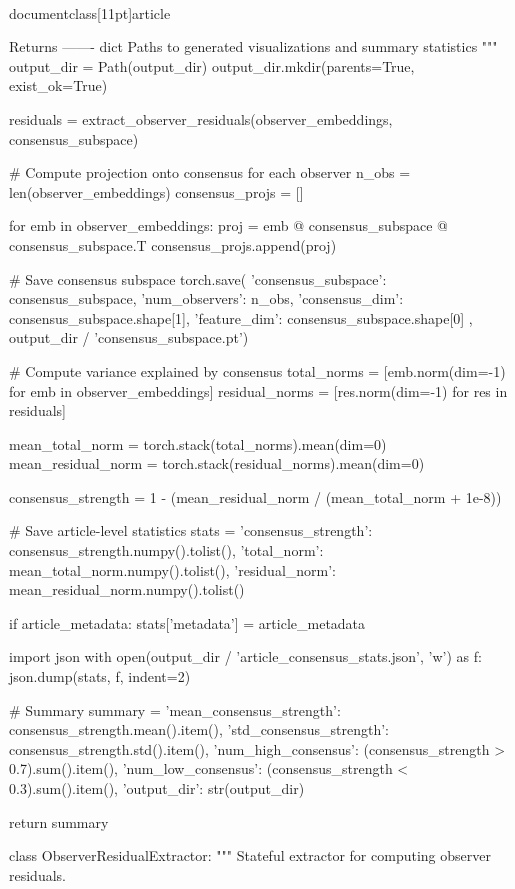\\documentclass[11pt]{article}
\begin{document}
\begin{CodeBlock}
    Returns
    -------
    dict
        Paths to generated visualizations and summary statistics
    """
    output_dir = Path(output_dir)
    output_dir.mkdir(parents=True, exist_ok=True)
    
    residuals = extract_observer_residuals(observer_embeddings, consensus_subspace)
    
    # Compute projection onto consensus for each observer
    n_obs = len(observer_embeddings)
    consensus_projs = []
    
    for emb in observer_embeddings:
        proj = emb @ consensus_subspace @ consensus_subspace.T
        consensus_projs.append(proj)
    
    # Save consensus subspace
    torch.save({
        'consensus_subspace': consensus_subspace,
        'num_observers': n_obs,
        'consensus_dim': consensus_subspace.shape[1],
        'feature_dim': consensus_subspace.shape[0]
    }, output_dir / 'consensus_subspace.pt')
    
    # Compute variance explained by consensus
    total_norms = [emb.norm(dim=-1) for emb in observer_embeddings]
    residual_norms = [res.norm(dim=-1) for res in residuals]
    
    mean_total_norm = torch.stack(total_norms).mean(dim=0)
    mean_residual_norm = torch.stack(residual_norms).mean(dim=0)
    
    consensus_strength = 1 - (mean_residual_norm / (mean_total_norm + 1e-8))
    
    # Save article-level statistics
    stats = {
        'consensus_strength': consensus_strength.numpy().tolist(),
        'total_norm': mean_total_norm.numpy().tolist(),
        'residual_norm': mean_residual_norm.numpy().tolist()
    }
    
    if article_metadata:
        stats['metadata'] = article_metadata
    
    import json
    with open(output_dir / 'article_consensus_stats.json', 'w') as f:
        json.dump(stats, f, indent=2)
    
    # Summary
    summary = {
        'mean_consensus_strength': consensus_strength.mean().item(),
        'std_consensus_strength': consensus_strength.std().item(),
        'num_high_consensus': (consensus_strength > 0.7).sum().item(),
        'num_low_consensus': (consensus_strength < 0.3).sum().item(),
        'output_dir': str(output_dir)
    }
    
    return summary


class ObserverResidualExtractor:
    """
    Stateful extractor for computing observer residuals.
    

\end{CodeBlock}
\end{document}

